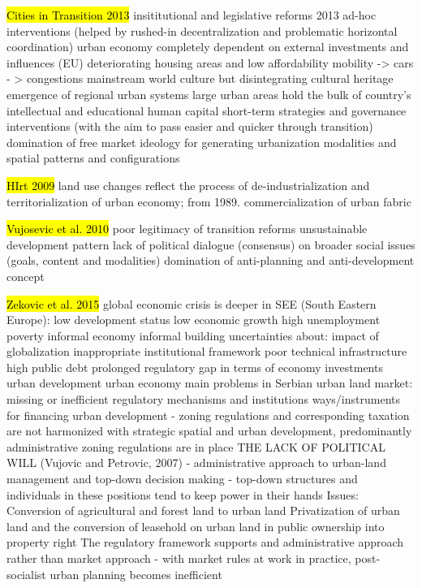 \documentclass[11pt]{report}
\begin{document}
\hl{Cities in Transition 2013}
insititutional and legislative reforms 2013
    ad-hoc interventions  (helped by rushed-in decentralization and problematic horizontal coordination)
    urban economy completely dependent on external investments and influences (EU)
    deteriorating housing areas and low affordability
    mobility -> cars - > congestions
    mainstream world culture but disintegrating cultural heritage
    emergence of regional urban systems
    large urban areas hold the bulk of country's intellectual and educational human capital
    short-term strategies and governance interventions (with the aim to pass easier and quicker through transition)
    domination of free market ideology for generating urbanization modalities and spatial patterns and configurations
    
\hl{HIrt 2009}
land use changes reflect the process of de-industrialization and territorialization of urban economy;
from 1989. commercialization of urban fabric

\hl{Vujosevic et al. 2010}
poor legitimacy of transition reforms
unsustainable development pattern
lack of political dialogue (consensus) on broader social issues (goals, content and modalities)
domination of anti-planning and anti-development concept

\hl{Zekovic et al. 2015}
global economic crisis is deeper in SEE (South Eastern Europe):
    low development status
    low economic growth
    high unemployment
    poverty
    informal economy
    informal building
    uncertainties about:
        impact of globalization
        inappropriate institutional framework
        poor technical infrastructure
        high public debt
    prolonged regulatory gap in terms of
        economy
        investments
        urban development
        urban economy
main problems in Serbian urban land market:
    missing or inefficient regulatory mechanisms and institutions
    ways/instruments for financing urban development
- zoning regulations and corresponding taxation are not harmonized with strategic spatial and urban development, predominantly administrative zoning regulations are in place
THE LACK OF POLITICAL WILL (Vujovic and Petrovic, 2007) - administrative approach to urban-land management and top-down decision making - top-down structures and individuals in these positions tend to keep power in their hands
Issues:
    Conversion of agricultural and forest land to urban land
    Privatization of urban land and the conversion of leasehold on urban land in public ownership into property right
The regulatory framework supports and administrative approach rather than market approach
- with market rules at work in practice, post-socialist urban planning becomes inefficient
\end{document}
